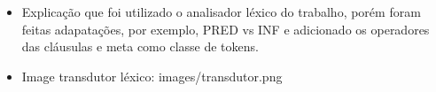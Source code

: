 
\begin{itemize}
	\item Explicação que foi utilizado o analisador léxico do trabalho, porém foram feitas adapatações, por exemplo, PRED vs INF e adicionado os operadores das cláusulas e meta como classe de tokens.
	\item Image transdutor léxico: images/transdutor.png
\end{itemize}
